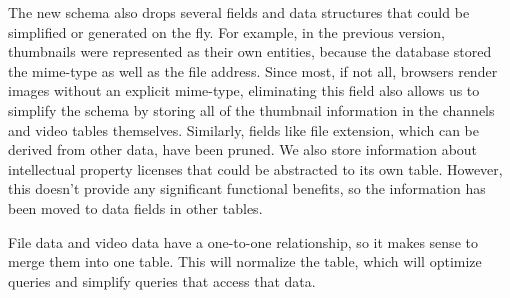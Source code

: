 \documentclass[a4paper,12pt]{report}
\begin{document}
The new schema also drops several fields and data structures that could be simplified or generated on the fly.
For example, in the previous version, thumbnails were represented as their own entities, because the database stored the mime-type as well as the file address.
Since most, if not all, browsers render images without an explicit mime-type, eliminating this field also allows us to simplify the schema by storing all of the thumbnail information in the channels and video tables themselves.
Similarly, fields like file extension, which can be derived from other data, have been pruned.
We also store information about intellectual property licenses that could be abstracted to its own table.
However, this doesn't provide any significant functional benefits, so the information has been moved to data fields in other tables. 

File data and video data have a one-to-one relationship, so it makes sense to merge them into one table.
This will normalize the table, which will optimize queries and simplify queries that access that data. 
\end{document}

